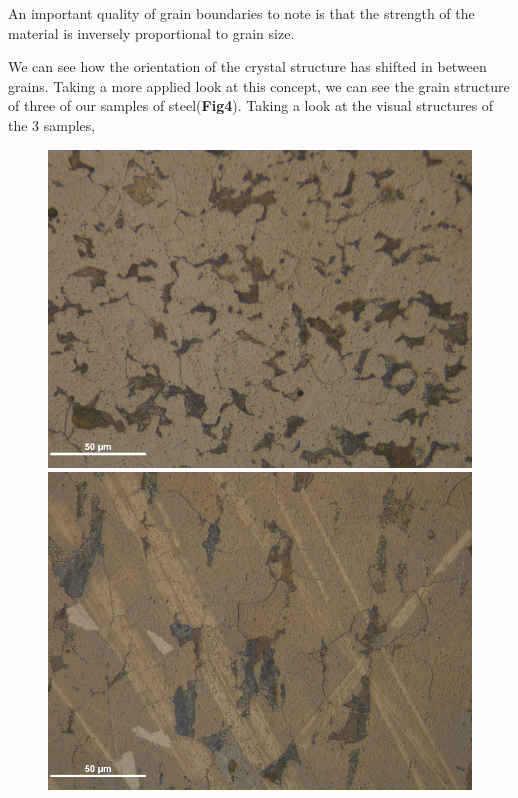 \documentclass{article}
\begin{document}
An important quality of grain boundaries to note is that the strength of the material is inversely proportional to grain size.

We can see how the orientation of the crystal structure has shifted in between grains. Taking a more applied look at this concept, we can see the grain structure of three of our samples of steel(\textbf{Fig4}). Taking a look at the visual structures of the 3 samples,

\begin{figure}[h]
	\begin{minipage}{0.32\textwidth}
		\centering
		\includegraphics[scale=.5]{TransAnnealedSteel.png}
	\end{minipage}
	\begin{minipage}{0.32\textwidth}
		\centering
		\includegraphics[scale=.5]{LongAnnealedSteel.png}

\end{minipage}
\end{figure}
\end{document}
